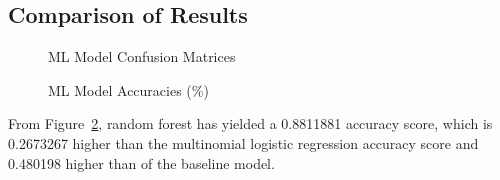 \documentclass[
  letterpaper,
  DIV=11,
  numbers=noendperiod]{scrartcl}
\begin{document}
\subsection{Comparison of Results}\label{comparison-of-results}

\begin{figure}


\caption{\label{fig-conf-comparison}ML Model Confusion Matrices}

\end{figure}%

\begin{figure}


\caption{\label{fig-accuracy-comparison}ML Model Accuracies (\%)}

\end{figure}%

From Figure~\ref{fig-accuracy-comparison}, random forest has yielded a
0.8811881 accuracy score, which is 0.2673267 higher than the multinomial
logistic regression accuracy score and 0.480198 higher than of the
baseline model.
\end{document}
